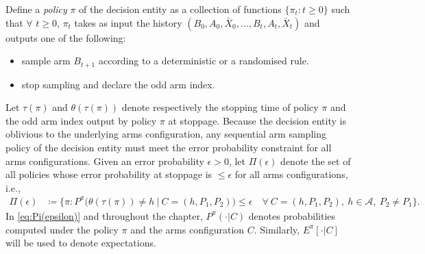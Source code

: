 Define a {\em policy} $\pi$ of the decision entity as a collection of functions $\{\pi_t:t\geq 0\}$ such that $\forall$ $t\geq 0$, $\pi_t$ takes as input the history $(B_0, A_0, \bar{X}_0, \ldots, B_t, A_t, \bar{X}_t)$ and outputs one of the following:
\begin{itemize}
	\item sample arm $B_{t+1}$ according to a deterministic or a randomised rule.
	\item stop sampling and declare the odd arm index.
\end{itemize}
Let $\tau(\pi)$ and $\theta(\tau(\pi))$ denote respectively the stopping time of policy $\pi$ and the odd arm index output by policy $\pi$ at stoppage. Because the decision entity is oblivious to the underlying arms configuration, any sequential arm sampling policy of the decision entity must meet the error probability constraint for all arms configurations. Given an error probability $\epsilon>0$, let $\Pi(\epsilon)$ denote the set of all policies whose error probability at stoppage is $\leq \epsilon$ for all arms configurations, i.e.,
\begin{align}
\Pi(\epsilon) & \coloneqq \bigg\lbrace\pi: P^\pi\bigg(\theta(\tau(\pi)) \neq h ~\bigg \vert~ C=(h, P_1, P_2)\bigg) \leq \epsilon \quad \forall ~C=(h, P_1, P_2),~h\in \mathcal{A},~P_2\neq P_1 \bigg\rbrace.
\label{eq:Pi(epsilon)}
\end{align}
In \eqref{eq:Pi(epsilon)} and throughout the chapter, $P^\pi(\cdot|C)$ denotes probabilities computed under the policy $\pi$ and the arms configuration $C$. Similarly, $E^\pi[\cdot|C]$ will be used to denote expectations.

